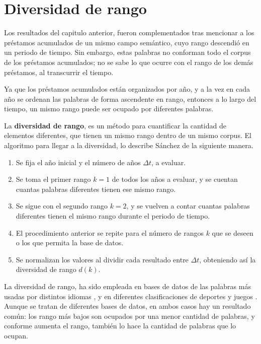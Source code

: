 \chapter{Diversidad de rango}
\label{cap.diversidad}

Los resultados del capitulo anterior, fueron complementados tras mencionar a los préstamos acumulados de un mismo campo semántico, cuyo rango descendió en un periodo de tiempo. Sin embargo, estas palabras no conforman todo el corpus de los préstamos acumulados; no se sabe lo que ocurre con el rango de los demás préstamos, al transcurrir el tiempo. 

Ya que los préstamos acumulados están organizados por año, y a la vez en cada año se ordenan las palabras de forma ascendente en rango, entonces a lo largo del tiempo, un mismo rango puede ser ocupado por diferentes palabras. 

La \textbf{diversidad de rango}, es un método para cuantificar la cantidad de elementos diferentes, que tienen un mismo rango dentro de un mismo corpus. El algoritmo para llegar a la diversidad, lo describe Sánchez \cite{tesis.sergio} de la siguiente manera.


\begin{enumerate}
		
	\item Se fija el año inicial y el número de años $\Delta t$, a evaluar.
	
	\item Se toma el primer rango $k=1$ de todos los años a evaluar, y se cuentan cuantas palabras diferentes tienen ese mismo rango. 
	
	\item Se sigue con el segundo rango $k=2$, y se vuelven a contar cuantas palabras diferentes tienen el mismo rango durante el periodo de tiempo. 
	
	\item El procedimiento anterior se repite para el número de rangos $k$ que se deseen o los que permita la base de datos. 
	
	\item Se normalizan los valores al dividir cada resultado entre $\Delta t$, obteniendo así la diversidad de rango $d(k)$.
	
\end{enumerate}

La diversidad de rango, ha sido empleada en bases de datos de las palabras más usadas por distintos idiomas \cite{iplosone}, y en diferentes clasificaciones de deportes y juegos \cite{epj}. Aunque se tratan de diferentes bases de datos, en ambos casos hay un resultado común: los rango más bajos son ocupados por una menor cantidad de palabras, y conforme aumenta el rango, también lo hace la cantidad de palabras que lo ocupan.

